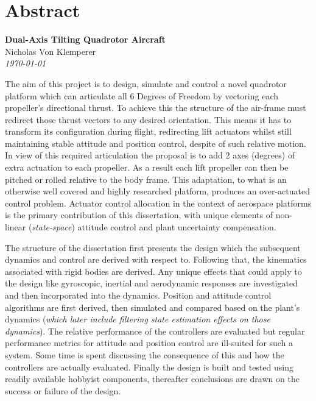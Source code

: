 \documentclass[a4paper, 11pt, oneside, openright, parskip=full]{book}
\newcommand{\auth}{Nicholas Von Klemperer}								%
\newcommand{\titl}{Dual-Axis Tilting Quadrotor Aircraft}						%
\begin{document}
\chapter{Abstract}				
\label{ch:abs}
\begin{center}
	\textbf{\Large \titl}\\
			\vskip 0.2cm
			\auth\\
			\vskip 0.2cm
	\textit{\footnotesize\today}
			\vskip 1cm
\end{center}
The aim of this project is to design, simulate and control a novel quadrotor platform which can articulate all 6 Degrees of Freedom by vectoring each propeller's directional thrust. To achieve this the structure of the air-frame must redirect those thrust vectors to any desired orientation. This means it has to transform its configuration during flight, redirecting lift actuators whilst still maintaining stable attitude and position control, despite of such relative motion. In view of this required articulation the proposal is to add 2 axes (degrees) of extra actuation to each propeller. As a result each lift propeller can then be pitched or rolled relative to the body frame. This adaptation, to what is an otherwise well covered and highly researched platform, produces an over-actuated control problem. Actuator control allocation in the context of aerospace platforms is the primary contribution of this dissertation, with unique elements of non-linear (\emph{state-space}) attitude control and plant uncertainty compensation.
\par
The structure of the dissertation first presents the design which the subsequent dynamics and control are derived with respect to. Following that, the kinematics associated with rigid bodies are derived. Any unique effects that could apply to the design like gyroscopic, inertial and aerodynamic responses are investigated and then incorporated into the dynamics. Position and attitude control algorithms are first derived, then simulated and compared based on the plant's dynamics (\emph{which later include filtering state estimation effects on those dynamics}). The relative performance of the controllers are evaluated but regular performance metrics for attitude and position control are ill-suited for such a system. Some time is spent discussing the consequence of this and how the controllers are actually evaluated. Finally the design is built and tested using readily available hobbyist components, thereafter conclusions are drawn on the success or failure of the design.
\end{document}
